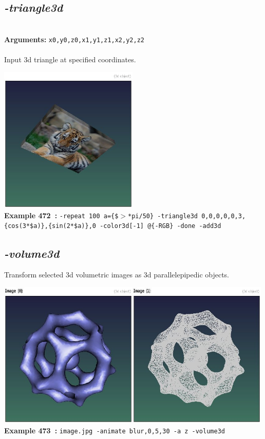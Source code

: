 \documentclass[a4paper,11pt,twoside]{book}
\begin{document}
\subsection{\emph{-triangle3d} }\vspace*{-0.5em}
~\\\textbf{Arguments: } 
{\small \texttt{x0,y0,z0,x1,y1,z1,x2,y2,z2}}\\~\\
Input 3d triangle at specified coordinates.
\begin{center}\includegraphics[keepaspectratio=true,height=7cm,width=\textwidth]{img/gmic_def472.jpg}\\
{\footnotesize \textbf{Example 472~:} \texttt{-repeat 100 a=\{\$$>$*pi/50\} -triangle3d 0,0,0,0,0,3,\{cos(3*\$a)\},\{sin(2*\$a)\},0 -color3d[-1] @\{-RGB\} -done -add3d}}
\end{center}

\subsection{\emph{-volume3d} }\vspace*{-0.5em}
Transform selected 3d volumetric images as 3d parallelepipedic objects.
\begin{center}\includegraphics[keepaspectratio=true,height=7cm,width=\textwidth]{img/gmic_def473.jpg}\\
{\footnotesize \textbf{Example 473~:} \texttt{image.jpg -animate blur,0,5,30 -a z -volume3d}}
\end{center}
\end{document}
